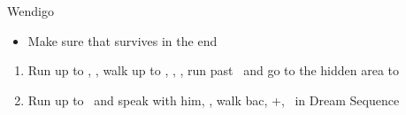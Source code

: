 \begin{battle}[18000]{Wendigo}
\begin{itemize}
	\tidusf Haste \tidus
	\tidusf Switch Weapon to Brotherhood
	\tidusf Attack Guado B
	\rikkuf Light Curtain \tidus
	\tidusf Attack Wendigo
	\yunaf Defend/Heal \tidus/Phoenix Down Dead Ally
	\rikkuf Defend/Heal \tidus/Steal Guado/Phoenix Down Dead Ally
	\item Make sure that \yuna survives in the end
\end{itemize}
\end{battle}
\begin{enumerate}[resume]
	\item Run up to \rikku, \sd, walk up to \yuna, \sd, \save, run past \kimahri\ and go to the hidden area to 
	\item Run up to \auron\ and speak with him, \sd, walk bac, \cs+\skippablefmv[1:00], \sd\ in Dream Sequence
\end{enumerate}

